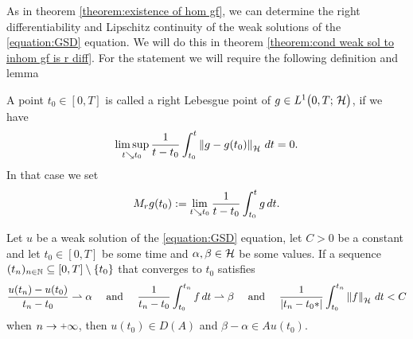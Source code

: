 As in theorem \ref{theorem:existence of hom gf}, we can determine
the right differentiability and Lipschitz continuity of the weak solutions of the 
\ref{equation:GSD} equation. We will do this
in theorem \ref{theorem:cond weak sol to inhom gf is r diff}. 
For the statement we will require
the following definition and lemma

\begin{definition}
	A point $ t_0\in [0,T] $ is called a right Lebesgue point of $ g\in L^{1}\big(0,T;\,\mathcal{H}\big) $,
	if we have
	\begin{align*}
		\limsup_{t \searrow t_0} \frac{1}{t-t_0}\int_{t_0}^t \left\Vert g-g(t_0)\right\Vert_{\mathcal{H}}\,dt
		=0.
	\end{align*}
	In that case we set
	\begin{align*}
		M_r g(t_0)
		:=\lim_{t \searrow t_0} \frac{1}{t-t_0}\int_{t_0}^t g\,dt.
	\end{align*}
\end{definition}

\begin{lemma}\label{lemma:weak sol in dom}
	Let $ u $ be a weak solution of the \ref{equation:GSD}
	equation, let $ C>0 $ be a constant and let
	$ t_0\in [0,T] $ be some time and $ \alpha,\beta\in\mathcal{H} $
	be some values. If a sequence
	$ (t_n)_{n\in\mathbb{N}}\subseteq [0,T]\setminus\{t_0\} $
	that converges to $ t_0 $ satisfies
	\begin{align*}
		\frac{u(t_n)-u(t_0)}{t_n-t_0} \rightharpoonup \alpha\quad\text{ and }\quad
		\frac{1}{t_n-t_0}\int_{t_0}^{t_n} f\,dt \rightharpoonup \beta\quad\text{ and }\quad
		\frac{1}{\left\vert t_n-t_0*\right\vert}\int_{t_0}^{t_n} \left\Vert f\right\Vert_{\mathcal{H}}\,dt <C
	\end{align*}
	when $ n\ra\plus\infty $,
	then $u(t_0)\in D(A)$ and $\beta - \alpha \in Au(t_0)$.
\end{lemma}

